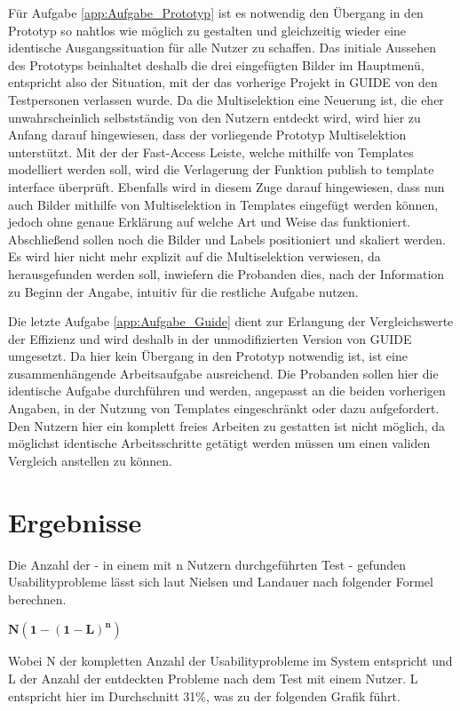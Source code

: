Für Aufgabe \ref{app:Aufgabe_Prototyp} ist es notwendig den Übergang in den Prototyp so nahtlos wie möglich zu gestalten und gleichzeitig wieder eine identische Ausgangssituation für alle Nutzer zu schaffen.
Das initiale Aussehen des Prototyps beinhaltet deshalb die drei eingefügten Bilder im Hauptmenü, entspricht also der Situation, mit der das vorherige Projekt in GUIDE von den Testpersonen verlassen wurde.
Da die Multiselektion eine Neuerung ist, die eher unwahrscheinlich selbstständig von den Nutzern entdeckt wird, wird hier zu Anfang darauf hingewiesen, dass der vorliegende Prototyp Multiselektion unterstützt.
Mit der der Fast-Access Leiste, welche mithilfe von Templates modelliert werden soll, wird die Verlagerung der Funktion \glqq publish to template interface\grqq{} überprüft.
Ebenfalls wird in diesem Zuge darauf hingewiesen, dass nun auch Bilder mithilfe von Multiselektion in Templates eingefügt werden können, jedoch ohne genaue Erklärung auf welche Art und Weise das funktioniert.
Abschließend sollen noch die Bilder und Labels positioniert und skaliert werden.
Es wird hier nicht mehr explizit auf die Multiselektion verwiesen, da herausgefunden werden soll, inwiefern die Probanden dies, nach der Information zu Beginn der Angabe, intuitiv für die restliche Aufgabe nutzen.

Die letzte Aufgabe \ref{app:Aufgabe_Guide} dient zur Erlangung der Vergleichswerte der Effizienz und wird deshalb in der unmodifizierten Version von GUIDE umgesetzt.
Da hier kein Übergang in den Prototyp notwendig ist, ist eine zusammenhängende Arbeitsaufgabe ausreichend.
Die Probanden sollen hier die identische Aufgabe durchführen und werden, angepasst an die beiden vorherigen Angaben, in der Nutzung von Templates eingeschränkt oder dazu aufgefordert.
Den Nutzern hier ein komplett freies Arbeiten zu gestatten ist nicht möglich, da möglichst identische Arbeitsschritte getätigt werden müssen um einen validen Vergleich anstellen zu können.

\section {Ergebnisse}
Die Anzahl der - in einem mit n Nutzern durchgeführten Test -  gefunden Usabilityprobleme lässt sich laut Nielsen und Landauer nach folgender Formel berechnen.

\begin{center}
$\mathbf{N (1-(1- L ) ^n )}$ 
\end{center}

Wobei N der kompletten Anzahl der Usabilityprobleme im System entspricht und L der Anzahl der entdeckten Probleme nach dem Test mit einem Nutzer.
L entspricht hier im Durchschnitt 31\%, was zu der folgenden Grafik führt.  \cite{Nielsen.1993}

